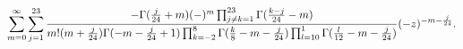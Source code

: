 \begin{equation}
\label{eq:sol1largez}
\sum_{m=0}^\infty\sum_{j=1}^{23}{-\Gamma({j\over24}+m)(-)^m\prod_{j\neq k=1}^{23}
\Gamma({k-j\over24}-m)\over m!(m+{j\over24})\Gamma(-m-{j\over24}+1)\prod_{k=-2}^8\Gamma
({k\over8}-m-{j\over24})\prod_{l=10}^1\Gamma({l\over12}-m-{j\over24})}(-z)^{-m-{j\over24}}.
\end{equation}

